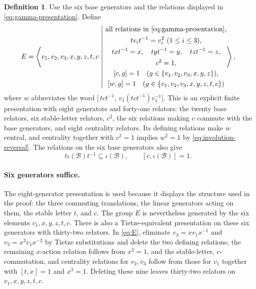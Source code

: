 \documentclass[11pt]{amsart}
\newcommand{\leanverified}[2]{\ignorespaces}
\theoremstyle{definition}
\newtheorem{definition}[theorem]{Definition}
\theoremstyle{remark}
\theoremstyle{plain}
\begin{document}
\begin{definition}\label{def:E}
Use the six base generators and the relations displayed in
\eqref{eq:gamma-presentation}.  Define
\begin{equation}\label{eq:E}
  E=\left\langle v_1,v_2,v_3,x,y,z,t,c\ \middle|\
  \begin{gathered}
   \text{all relations in \eqref{eq:gamma-presentation}},\\
   tv_i t^{-1}=v_i^2\ (1\le i\le3),\\
   txt^{-1}=x,\quad tyt^{-1}=y,\quad tzt^{-1}=z,\\
   c^2=1,\\
   [c,g]=1\quad(g\in\{v_1,v_2,v_3,x,y,z\}),\\
   [w,g]=1\quad(g\in\{v_1,v_2,v_3,x,y,z,t,c\})
  \end{gathered}\right\rangle,
\end{equation}
where $w$ abbreviates the word
$\bigl[\,tct^{-1},\,v_1(tct^{-1})v_1^{-1}\bigr]$.
This is an explicit finite presentation with eight generators and
forty-one relators: the twenty base relators, six stable-letter
relators, $c^2$, the six relations making $c$ commute with the base
generators, and eight centrality relators.  Its defining
relations make $w$ central, and centrality together with $c^2=1$ implies
$w^2=1$ by \eqref{eq:involution-reversal}.  The relations on the six base
generators also give
\leanverified{Sofic/LiteralNonMFPresentation}{GroupApproximation.LiteralNonMFPresentation.manuscriptLiteralPresentation}
\[
 t\iota(\mathcal B)t^{-1}\subseteq\iota(\mathcal B),
 \qquad [c,\iota(\mathcal B)]=1.
\]
\end{definition}

\paragraph{Six generators suffice.}
The eight-generator presentation is used because it displays the
structure used in the proof: the three commuting translations, the
linear generators acting on them, the stable letter $t$, and $c$.
The group $E$ is nevertheless generated by the six elements
$v_1,x,y,z,t,c$.
There is also a Tietze-equivalent presentation on these six generators
with thirty-two relators.
\leanverified{Sofic/LiteralSixGenerator}{GroupApproximation.LiteralSixGenerator.literal_sixGenerated_finitelyPresented_nonMF}
\leanverified{Sofic/LiteralTietzePresentation}{GroupApproximation.LiteralTietzePresentation.manuscriptTietzeSixGeneratorPresentation}
In \eqref{eq:E}, eliminate $v_3=xv_1x^{-1}$ and $v_2=x^2v_1x^{-2}$ by
Tietze substitutions and delete the two defining relations; the
remaining $x$-action relation follows from $x^3=1$, and the
stable-letter, $c$-commutation, and centrality relations for $v_2,v_3$
follow from those for $v_1$ together with $[t,x]=1$ and $x^3=1$.
Deleting these nine leaves thirty-two relators on $v_1,x,y,z,t,c$.
\end{document}
